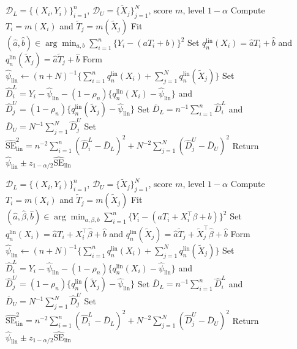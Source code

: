 \documentclass{article}
\theoremstyle{plain}
\theoremstyle{definition}
\newcommand{\1}{\mathbf{1}}
\newcommand{\mhat}{m}
\newcommand{\rhon}{\rho_n}
\begin{document}
\begin{algorithm}[t]
\caption{Linearly calibrated PPI}
\label{alg:linearppi-basic}
\begin{algorithmic}[1]
\Require \(\mathcal D_L=\{(X_i,Y_i)\}_{i=1}^n\), \(\mathcal D_U=\{\widetilde X_j\}_{j=1}^N\), score \(\mhat\), level \(1-\alpha\)
\State Compute \(T_i=\mhat(X_i)\) and \(\widetilde T_j=\mhat(\widetilde X_j)\)
\State Fit \((\hat a,\hat b)\in\arg\min_{a,b}\sum_{i=1}^n\{Y_i-(aT_i+b)\}^2\)
\State Set \(q_n^{\mathrm{lin}}(X_i)=\hat aT_i+\hat b\) and \(q_n^{\mathrm{lin}}(\widetilde X_j)=\hat a\widetilde T_j+\hat b\)
\State Form \(\widehat\psi_{\mathrm{lin}}\gets (n+N)^{-1}\{\sum_{i=1}^n q_n^{\mathrm{lin}}(X_i)+\sum_{j=1}^N q_n^{\mathrm{lin}}(\widetilde X_j)\}\)
\State Set \(\widehat D_i^L=Y_i-\widehat\psi_{\mathrm{lin}}-(1-\rhon)\{q_n^{\mathrm{lin}}(X_i)-\widehat\psi_{\mathrm{lin}}\}\) and \(\widehat D_j^U=(1-\rhon)\{q_n^{\mathrm{lin}}(\widetilde X_j)-\widehat\psi_{\mathrm{lin}}\}\)
\State Set \(\overline D_L=n^{-1}\sum_{i=1}^n\widehat D_i^L\) and \(\overline D_U=N^{-1}\sum_{j=1}^N\widehat D_j^U\)
\State Set \(\widehat{\mathrm{SE}}_{\mathrm{lin}}^2=n^{-2}\sum_{i=1}^n(\widehat D_i^L-\overline D_L)^2+N^{-2}\sum_{j=1}^N(\widehat D_j^U-\overline D_U)^2\)
\State Return \(\widehat\psi_{\mathrm{lin}} \pm z_{1-\alpha/2}\widehat{\mathrm{SE}}_{\mathrm{lin}}\)
\end{algorithmic}
\end{algorithm}

\begin{algorithm}[t]
\caption{Linearly calibrated PPI with covariate adjustment}
\label{alg:linearppi}
\begin{algorithmic}[1]
\Require \(\mathcal D_L=\{(X_i,Y_i)\}_{i=1}^n\), \(\mathcal D_U=\{\widetilde X_j\}_{j=1}^N\), score \(\mhat\), level \(1-\alpha\)
\State Compute \(T_i=\mhat(X_i)\) and \(\widetilde T_j=\mhat(\widetilde X_j)\)
\State Fit \((\hat a,\hat\beta,\hat b)\in\arg\min_{a,\beta,b}\sum_{i=1}^n\{Y_i-(aT_i+X_i^\top\beta+b)\}^2\)
\State Set \(q_n^{\mathrm{lin}}(X_i)=\hat aT_i+X_i^\top\hat\beta+\hat b\) and \(q_n^{\mathrm{lin}}(\widetilde X_j)=\hat a\widetilde T_j+\widetilde X_j^\top\hat\beta+\hat b\)
\State Form \(\widehat\psi_{\mathrm{lin}}\gets (n+N)^{-1}\{\sum_{i=1}^n q_n^{\mathrm{lin}}(X_i)+\sum_{j=1}^N q_n^{\mathrm{lin}}(\widetilde X_j)\}\)
\State Set \(\widehat D_i^L=Y_i-\widehat\psi_{\mathrm{lin}}-(1-\rhon)\{q_n^{\mathrm{lin}}(X_i)-\widehat\psi_{\mathrm{lin}}\}\) and \(\widehat D_j^U=(1-\rhon)\{q_n^{\mathrm{lin}}(\widetilde X_j)-\widehat\psi_{\mathrm{lin}}\}\)
\State Set \(\overline D_L=n^{-1}\sum_{i=1}^n\widehat D_i^L\) and \(\overline D_U=N^{-1}\sum_{j=1}^N\widehat D_j^U\)
\State Set \(\widehat{\mathrm{SE}}_{\mathrm{lin}}^2=n^{-2}\sum_{i=1}^n(\widehat D_i^L-\overline D_L)^2+N^{-2}\sum_{j=1}^N(\widehat D_j^U-\overline D_U)^2\)
\State Return \(\widehat\psi_{\mathrm{lin}} \pm z_{1-\alpha/2}\widehat{\mathrm{SE}}_{\mathrm{lin}}\)
\end{algorithmic}
\end{algorithm}
\end{document}
